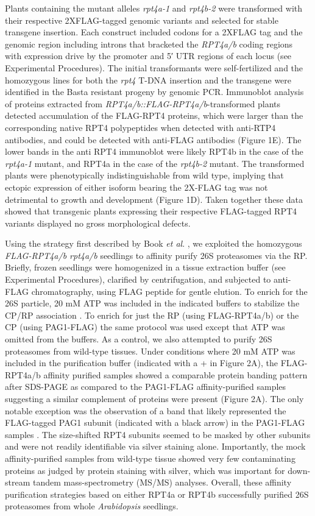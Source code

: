 Plants containing the mutant alleles \textit{rpt4a-1} and \textit{rpt4b-2} were transformed with their respective 2XFLAG-tagged genomic variants and selected for stable transgene insertion. Each construct included codons for a 2XFLAG tag and the genomic region including introns that bracketed the \textit{RPT4a/b} coding regions with expression drive by the promoter and 5′ UTR regions of each locus (see Experimental Procedures). The initial transformants were self-fertilized and the homozygous lines for both the \textit{rpt4} T-DNA insertion and the transgene were identified in the Basta resistant progeny by genomic PCR.  Immunoblot analysis of proteins extracted from \textit{RPT4a/b::FLAG-RPT4a/b}-transformed plants detected accumulation of the FLAG-RPT4 proteins, which were larger than the corresponding native RPT4 polypeptides when detected with anti-RTP4 antibodies, and could be detected with anti-FLAG antibodies (Figure 1E).  The lower bands in the anti RPT4 immunoblot were likely RPT4b in the case of the \textit{rpt4a-1} mutant, and RPT4a in the case of the \textit{rpt4b-2} mutant. The transformed plants were phenotypically indistinguishable from wild type, implying that ectopic expression of either isoform bearing the 2X-FLAG tag was not detrimental to growth and development (Figure 1D).  Taken together these data showed that transgenic plants expressing their respective FLAG-tagged RPT4 variants displayed no gross morphological defects.

	Using the strategy first described by Book \textit{et al}. \citep{book10}, we exploited the homozygous \textit{FLAG-RPT4a/b rpt4a/b} seedlings to affinity purify 26S proteasomes via the RP. Briefly, frozen seedlings were homogenized in a tissue extraction buffer (see Experimental Procedures), clarified by centrifugation, and subjected to anti-FLAG chromatography, using FLAG peptide for gentle elution.  To enrich for the 26S particle, 20 mM ATP was included in the indicated buffers to stabilize the CP/RP association \citep{book10, liu06}. To enrich for just the RP (using FLAG-RPT4a/b) or the CP (using PAG1-FLAG) the same protocol was used except that ATP was omitted from the buffers. As a control, we also attempted to purify 26S proteasomes from wild-type tissues.  Under conditions where 20 mM ATP was included in the purification buffer (indicated with a + in Figure 2A), the FLAG-RPT4a/b affinity purified samples showed a comparable protein banding pattern after SDS-PAGE as compared to the PAG1-FLAG affinity-purified samples suggesting a similar complement of proteins were present (Figure 2A). The only notable exception was the observation of a band that likely represented the FLAG-tagged PAG1 subunit (indicated with a black arrow) in the PAG1-FLAG samples \citep{book10}. The size-shifted RPT4 subunits seemed to be masked by other subunits and were not readily identifiable via silver staining alone. Importantly, the mock affinity-purified samples from wild-type tissue showed very few contaminating proteins as judged by protein staining with silver, which was important for down-stream tandem mass-spectrometry (MS/MS) analyses. Overall, these affinity purification strategies based on either RPT4a or RPT4b successfully purified 26S proteasomes from whole \textit{Arabidopsis} seedlings.
	
